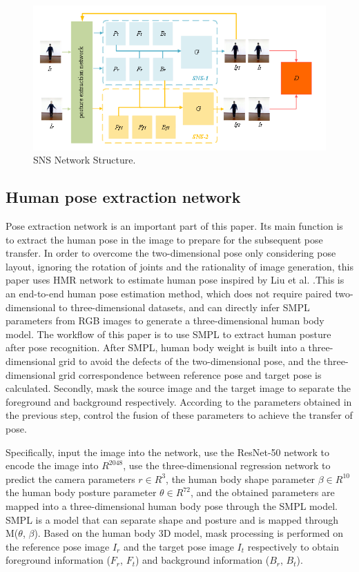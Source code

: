 \begin{figure}
		\centering
		\includegraphics[scale=1]{image03.png}
		\caption{SNS Network Structure.}
		\label{image03}
\end{figure}
	
\subsection{Human pose extraction network}
Pose extraction network is an important part of this paper. Its main function is to extract the human pose in the image to prepare for the subsequent pose transfer. In order to overcome the two-dimensional pose only considering pose layout, ignoring the rotation of joints and the rationality of image generation, this paper uses HMR \cite{kanazawa2018end} network to estimate human pose inspired by Liu et al. \cite{liu2019liquid}.This is an end-to-end human pose estimation method, which does not require paired two-dimensional to three-dimensional datasets, and can directly infer SMPL parameters from RGB images to generate a three-dimensional human body model. The workflow of this paper is to use SMPL to extract human posture after pose recognition. After SMPL, human body weight is built into a three-dimensional grid to avoid the defects of the two-dimensional pose, and the three-dimensional grid correspondence between reference pose and target pose is calculated. Secondly, mask the source image and the target image to separate the foreground and background respectively. According to the parameters obtained in the previous step, control the fusion of these parameters to achieve the transfer of pose.
	
Specifically, input the image into the network, use the ResNet-50 network to encode the image into $ R^{2048} $, use the three-dimensional regression network to predict the camera parameters $r \in R^{3}$, the human body shape parameter $ \beta \in R^{10} $ the human body posture parameter $\theta \in R^{72}$, and the obtained parameters are mapped into a three-dimensional human body pose through the SMPL model. SMPL is a model that can separate shape and posture and is mapped through M($ \theta $, $ \beta $). Based on the human body 3D model, mask processing is performed on the reference pose image $I_{r}$ and the target pose image $ I_{t} $ respectively to obtain foreground information ($F_r$, $F_t$) and background information ($B_r$, $B_t$).
	
